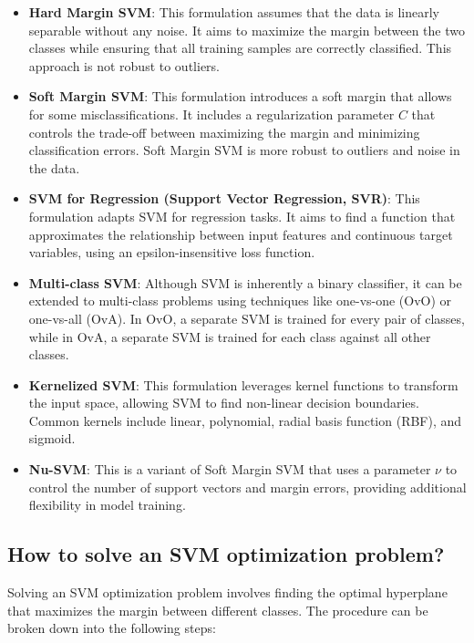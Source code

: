 \begin{itemize}
    \item \textbf{Hard Margin SVM}: This formulation assumes that the data is linearly separable without any noise. It aims to maximize the margin between the two classes while ensuring that all training samples are correctly classified. This approach is not robust to outliers.

    \item \textbf{Soft Margin SVM}: This formulation introduces a soft margin that allows for some misclassifications. It includes a regularization parameter \(C\) that controls the trade-off between maximizing the margin and minimizing classification errors. Soft Margin SVM is more robust to outliers and noise in the data.

    \item \textbf{SVM for Regression (Support Vector Regression, SVR)}: This formulation adapts SVM for regression tasks. It aims to find a function that approximates the relationship between input features and continuous target variables, using an epsilon-insensitive loss function.

    \item \textbf{Multi-class SVM}: Although SVM is inherently a binary classifier, it can be extended to multi-class problems using techniques like one-vs-one (OvO) or one-vs-all (OvA). In OvO, a separate SVM is trained for every pair of classes, while in OvA, a separate SVM is trained for each class against all other classes.

    \item \textbf{Kernelized SVM}: This formulation leverages kernel functions to transform the input space, allowing SVM to find non-linear decision boundaries. Common kernels include linear, polynomial, radial basis function (RBF), and sigmoid.

    \item \textbf{Nu-SVM}: This is a variant of Soft Margin SVM that uses a parameter \(\nu\) to control the number of support vectors and margin errors, providing additional flexibility in model training.
\end{itemize}


\subsection{How to solve an SVM optimization problem?}

Solving an SVM optimization problem involves finding the optimal hyperplane that maximizes the margin between different classes. The procedure can be broken down into the following steps:

